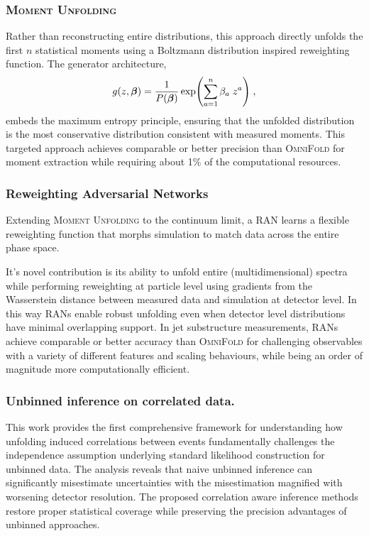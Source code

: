             \subsubsection{\textsc{Moment Unfolding}}
                Rather than reconstructing entire distributions, this approach directly unfolds the first \(n\) statistical moments using a Boltzmann distribution inspired reweighting function.
            The generator architecture,
            \[
            g(z,\vb*{\beta}) = \frac1{P(\vb*\beta)} \exp(\sum_{a=1}^n \beta_a \;z^a)\;,
            \] embeds the maximum entropy principle, ensuring that the unfolded distribution is the most conservative distribution consistent with measured moments.
            This targeted approach achieves comparable or better precision than \textsc{OmniFold} for moment extraction while requiring about  1\(\%\) of the computational resources.
            \subsubsection{Reweighting Adversarial Networks}
                
                Extending \textsc{Moment Unfolding} to the continuum limit, a RAN learns a flexible reweighting function that morphs simulation to match data across the entire phase space.
            
                It's novel contribution is its ability to unfold entire (multidimensional) spectra while performing reweighting at particle level using gradients from the Wasserstein distance between measured data and simulation at detector level.
                In this way RANs enable robust unfolding even when detector level distributions have minimal overlapping support.
            In jet substructure measurements, RANs achieve comparable or better accuracy than \textsc{OmniFold} for challenging observables with a variety of different features and scaling behaviours, while being an order of magnitude more computationally efficient.
            \subsubsection{Unbinned inference on correlated data.}
            This work provides the first comprehensive framework for understanding how unfolding induced correlations between events fundamentally challenges the independence assumption underlying standard likelihood construction for unbinned data.
            The analysis reveals that naive unbinned inference can significantly misestimate uncertainties with the misestimation magnified with worsening detector resolution.
            The proposed correlation aware inference methods restore proper statistical coverage while preserving the precision advantages of unbinned approaches.
            
